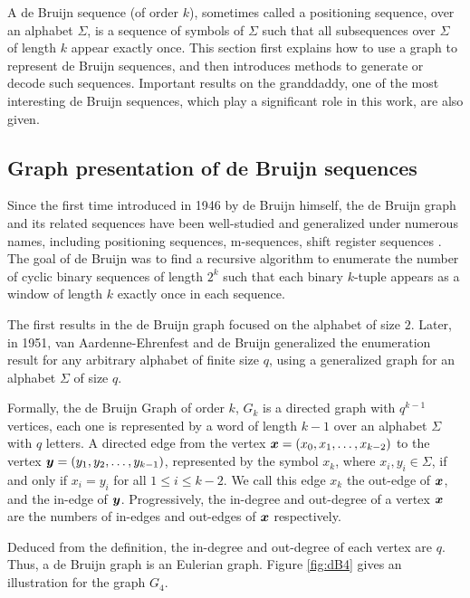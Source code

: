 A de Bruijn sequence (of order $k$), sometimes called a positioning sequence, over an alphabet $\Sigma$, is a sequence of symbols of $\Sigma$ such that all subsequences over $\Sigma$ of length $k$ appear exactly once. This section first explains how to use a graph to represent de Bruijn sequences, and then introduces methods to generate or decode such sequences. Important results on the granddaddy, one of the most interesting de Bruijn sequences, which play a significant role in this work, are also given. 

\subsection{Graph presentation of de Bruijn sequences}

Since the first time introduced in 1946 by de Bruijn himself, the de Bruijn graph and its related sequences have been well-studied and generalized under numerous names, including positioning sequences, m-sequences, shift register sequences \cite{song2021robust,etzion1984algorithms,fredricksen1982survey,lempel1970homomorphism,cohn1977fast}. The goal of de Bruijn was to find a recursive algorithm to enumerate the number of cyclic binary sequences of length $2^k$ such that each binary $k$-tuple appears as a window of length $k$ exactly once in each sequence. 

The first results in the de Bruijn graph focused on the alphabet of size $2$. Later, in 1951, van Aardenne-Ehrenfest and de Bruijn \cite{van1951circuits} generalized the enumeration result for any arbitrary alphabet of finite size $q$, using a generalized graph for an alphabet $\Sigma$ of size $q$. 

\begin{definition}
    Formally, the de Bruijn Graph of order $k$, $G_{k}$ is a directed graph with $q^{k-1}$ vertices, each one is represented by a word of length $k-1$ over an alphabet $\Sigma$ with $q$ letters. A directed edge from the vertex ${\boldsymbol x}=(x_{0},x_{1},\ldots,x_{k-2})$ to the vertex ${\boldsymbol y}=(y_{1},y_{2},\ldots,y_{k-1})$, represented by the symbol $x_{k}$, where $x_{i},y_{i}\in\Sigma$, if and only if $x_{i}=y_{i}$ for all $1\leq i\leq k-2$. We call this edge $x_{k}$ the out-edge of ${\boldsymbol x}$, and the in-edge of ${\boldsymbol y}$. Progressively, the in-degree and out-degree of a vertex ${\boldsymbol x}$ are the numbers of in-edges and out-edges of ${\boldsymbol x}$ respectively.
\end{definition}  Deduced from the definition, the in-degree and out-degree of each vertex are $q$. Thus, a de Bruijn graph is an Eulerian graph. Figure \ref{fig:dB4} gives an illustration for the graph $G_{4}$.


